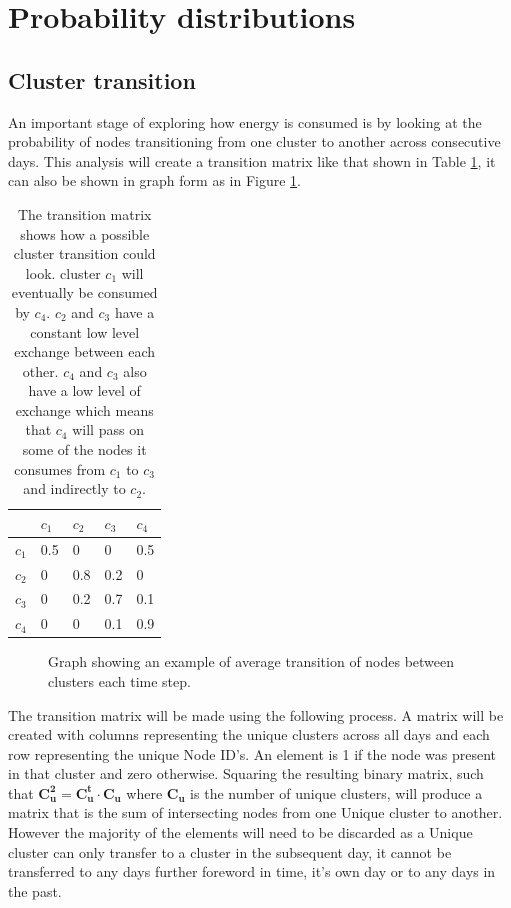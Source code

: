 \section{Probability distributions}

\subsection{Cluster transition}
\label{sec:Clusttrans}
An important stage of exploring how energy is consumed is by looking at the probability of nodes transitioning from one cluster to another across consecutive days. This analysis will create a transition matrix like that shown in Table \ref{tab:trans}, it can also be shown in graph form as in Figure \ref{fig:exampletrans}. 

\begin{table}[ht]
\centering
\begin{tabular}{|l|llll|} \hline
   & $c_1$  & $c_2$  & $c_3$  & $c_4$  \\ \hline
$c_1$ & 0.5 & 0   & 0   & 0.5 \\
$c_2$ & 0   & 0.8 & 0.2 & 0   \\
$c_3$ & 0   & 0.2 & 0.7 & 0.1   \\
$c_4$ & 0   & 0   & 0.1   & 0.9  \\ \hline
\end{tabular}
\caption[Example Cluster Transition matrix]{The transition matrix shows how a possible cluster transition could look. cluster $c_1$ will eventually be consumed by $c_4$. $c_2$ and $c_3$ have a constant low level exchange between each other. $c_4$ and $c_3$ also have a low level of exchange which means that $c_4$ will pass on some of the nodes it consumes from $c_1$ to $c_3$ and indirectly to $c_2$.}
\label{tab:trans}

\end{table}


\begin{figure}[ht]
\centering
  
  \caption[Example cluster transition graph]{Graph showing an example of average transition of nodes between clusters each time step.}
  \label{fig:exampletrans}
\end{figure}

The transition matrix will be made using the following process. A matrix will be created with columns representing the unique clusters across all days and each row representing the unique Node ID's. An element is 1 if the node was present in that cluster and zero otherwise. Squaring the resulting binary matrix, such that $\mathbf{C_u^2}=\mathbf{C_u^t} \cdot \mathbf{C_u}$ where $\mathbf{C_u}$  is the number of unique clusters, will produce a matrix that is the sum of intersecting nodes from one Unique cluster to another. However the majority of the elements will need to be discarded as a Unique cluster can only transfer to a cluster in the subsequent day, it cannot be transferred to any days further foreword in time, it's own day or to any days in the past.

